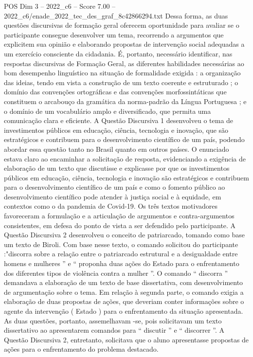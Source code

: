 \begin{textsample}{POS Dim 3 – 2022\_c6 – Score 7.00 – 2022\_c6/enade\_2022\_tec\_des\_graf\_8c42866294.txt}
Dessa forma, as duas questões discursivas de formação geral oferecem oportunidade para avaliar se o participante consegue desenvolver um tema, recorrendo a argumentos que explicitem sua opinião e elaborando propostas de intervenção social adequadas a um exercício consciente da cidadania.
É, portanto, necessário identificar, nas respostas discursivas de Formação Geral, as diferentes habilidades necessárias ao bom desempenho linguístico na situação de formalidade exigida : a organização das ideias, tendo em vista a construção de um texto coerente e estruturado ; o domínio das convenções ortográficas e das convenções morfossintáticas que constituem o arcabouço da gramática da norma-padrão da Língua Portuguesa ; e o domínio de um vocabulário amplo e diversificado, que permita uma comunicação clara e eficiente.
A Questão Discursiva 1 desenvolveu o tema de investimentos públicos em educação, ciência, tecnologia e inovação, que são estratégicos e contribuem para o desenvolvimento científico de um país, podendo abordar essa questão tanto no Brasil quanto em outros países.
O enunciado estava claro ao encaminhar a solicitação de resposta, evidenciando a exigência de elaboração de um texto que discutisse e explicasse por que os investimentos públicos em educação, ciência, tecnologia e inovação são estratégicos e contribuem para o desenvolvimento científico de um país e como o fomento público ao desenvolvimento científico pode atender à justiça social e à equidade, em contextos como o da pandemia de Covid-19.
Os três textos motivadores favoreceram a formulação e a articulação de argumentos e contra-argumentos consistentes, em defesa do ponto de vista a ser defendido pelo participante.
A Questão Discursiva 2 desenvolveu o conceito de patriarcado, tomando como base um texto de Biroli.
Com base nesse texto, o comando solicitou do participante :"discorra sobre a relação entre o patriarcado estrutural e a desigualdade entre homens e mulheres ” e “ proponha duas ações do Estado para o enfrentamento dos diferentes tipos de violência contra a mulher ”.
O comando “ discorra ” demandava a elaboração de um texto de base dissertativa, com desenvolvimento de argumentação sobre o tema.
Em relação à segunda parte, o comando exigia a elaboração de duas propostas de ações, que deveriam conter informações sobre o agente da intervenção ( Estado ) para o enfrentamento da situação apresentada.
As duas questões, portanto, assemelhavam -se, pois solicitavam um texto dissertativo ao apresentarem comandos para “ discutir ” e “ discorrer ”.
A Questão Discursiva 2, entretanto, solicitava que o aluno apresentasse propostas de ações para o enfrentamento do problema destacado.

\end{textsample}
